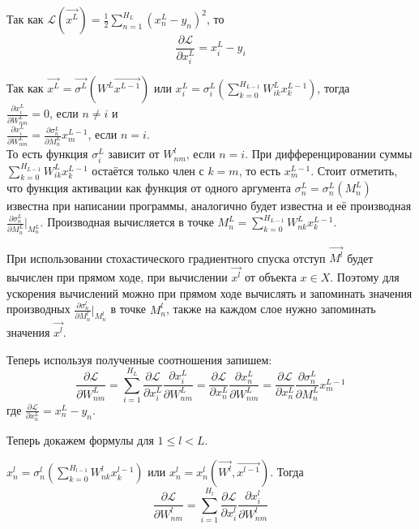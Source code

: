 Так как $\mathcal{L} (\overrightarrow{x^L}) = \frac{1}{2} \sum\limits_{n = 1}^{H_L} (x^L_n - y_n)^2$, то
$$
\frac{\partial \mathcal{L}}{\partial x^L_i} = x^L_i - y_i
$$

Так как $\overrightarrow{x^L} = \overrightarrow{\sigma^L}(W^L \overrightarrow{x^{L-1}})$ или $x^L_i = \sigma^L_i\left(\sum\limits_{k = 0}^{H_{L-1}} W^{L}_{ik} x^{L-1}_k\right)$, тогда \\
$\frac{\partial x^L_i}{\partial W^L_{nm}} = 0$, если $n \neq i$ и \\
$\frac{\partial x^L_i}{\partial W^L_{nm}} = \frac{\partial \sigma^L_n}{\partial M^L_n} x^{L-1}_m$, если $n = i$. \\
То есть функция $\sigma^L_i$ зависит от $W^l_{nm}$, если $n = i$. При дифференцировании суммы $\sum\limits_{k = 0}^{H_{L-1}} W^{L}_{ik} x^{L-1}_k$ остаётся только член с $k = m$, то есть $x^{L-1}_m$. Стоит отметить, что функция активации как функция от одного аргумента $\sigma^L_n = \sigma^L_n(M^L_n)$ известна при написании программы, аналогично будет известна и её производная $\frac{\partial \sigma^L_n}{\partial M^L_n}\Big|_{M^L_n}$. Производная вычисляется в точке $M^L_n = \sum\limits_{k = 0}^{H_{L-1}} W^{L}_{nk} x^{L-1}_k$. 

При использовании стохастического градиентного спуска отступ $\overrightarrow{M^l}$ будет вычислен при прямом ходе, при вычислении $\overrightarrow{x^l}$ от объекта $x \in X$. Поэтому для ускорения вычислений можно при прямом ходе вычислять и запоминать значения производных $\frac{\partial \sigma^l_n}{\partial M^l_n}\Big|_{M^l_n}$ в точке $M^l_n$, также на каждом слое нужно запоминать значения $\overrightarrow{x^l}$.

Теперь используя полученные соотношения запишем:
$$
\frac{\partial \mathcal{L}}{\partial {W^{L}_{nm}}} = \sum\limits_{i = 1}^{H_L} \frac{\partial \mathcal{L}}{\partial x^L_i} \frac{\partial x^L_i}{\partial W^L_{nm}} = \frac{\partial \mathcal{L}}{\partial x^L_n} \frac{\partial x^L_n}{\partial W^L_{nm}} = \frac{\partial \mathcal{L}}{\partial x^L_n} \frac{\partial \sigma^L_n}{\partial M^L_n} x^{L-1}_m
$$
где $\frac{\partial \mathcal{L}}{\partial x^L_n} = x^L_n - y_n$.

Теперь докажем формулы для $1 \le l < L$.

$x^l_n = \sigma^l_n\left(\sum\limits_{k = 0}^{H_{l-1}} W^{l}_{nk} x^{l-1}_k\right)$ или $x^l_n = x^l_n (\overrightarrow{W^l}, \overrightarrow{x^{l-1}})$. Тогда
$$
\frac{\partial \mathcal{L}}{\partial W^l_{nm}} = \sum_{i = 1}^{H_l} \frac{\partial \mathcal{L}}{\partial x^l_i} \frac{\partial x^l_i}{\partial W^{l}_{nm}}
$$

